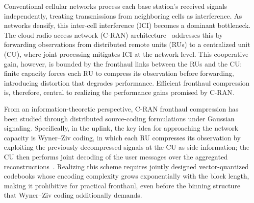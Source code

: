 \documentclass[10pt, twocolumn, comsoc]{IEEEtran}
\begin{document}
Conventional cellular networks process each base station's received signals
independently, treating transmissions from neighboring cells as interference. As networks densify, this inter-cell interference (ICI) becomes a dominant bottleneck. 
The cloud radio access network (C-RAN) architecture~\cite{gesbert2010multi,peng2015fronthaul} addresses this by forwarding observations from distributed remote units (RUs) to a centralized unit (CU), where joint processing mitigates ICI at the network level. 
This cooperative gain, however, is bounded by the fronthaul links between the RUs and the CU: finite capacity forces each RU to compress its observation before forwarding, introducing distortion that degrades performance. 
Efficient fronthaul compression is, therefore, central to realizing the performance gains promised by C-RAN.


From an information-theoretic perspective, C-RAN fronthaul compression has been studied through 
distributed source-coding formulations under Gaussian signaling. 
Specifically, in the uplink, the key idea for approaching the network capacity is Wyner--Ziv coding, in which each RU compresses its observation by exploiting the previously decompressed signals at the CU as side information; the CU then performs joint decoding of the user messages over the aggregated reconstructions~\cite{sanderovich2009uplink, park2013robust, zhou2014optimized}. 
Realizing this scheme requires jointly designed vector-quantized codebooks whose encoding complexity grows exponentially with the block length, making it prohibitive for practical fronthaul, even before the binning structure that Wyner--Ziv coding additionally demands.

\end{document}
